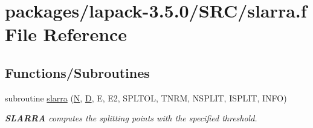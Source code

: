 \hypertarget{slarra_8f}{}\section{packages/lapack-\/3.5.0/\+S\+R\+C/slarra.f File Reference}
\label{slarra_8f}
\subsection*{Functions/\+Subroutines}
\begin{DoxyCompactItemize}
\item 
subroutine \hyperlink{group__auxOTHERauxiliary_ga4f440e7139c504926241c9f7f71332d2}{slarra} (\hyperlink{polmisc_8c_a0240ac851181b84ac374872dc5434ee4}{N}, \hyperlink{odrpack_8h_a7dae6ea403d00f3687f24a874e67d139}{D}, E, E2, S\+P\+L\+T\+O\+L, T\+N\+R\+M, N\+S\+P\+L\+I\+T, I\+S\+P\+L\+I\+T, I\+N\+F\+O)
\begin{DoxyCompactList}\small\item\em {\bfseries S\+L\+A\+R\+R\+A} computes the splitting points with the specified threshold. \end{DoxyCompactList}\end{DoxyCompactItemize}
